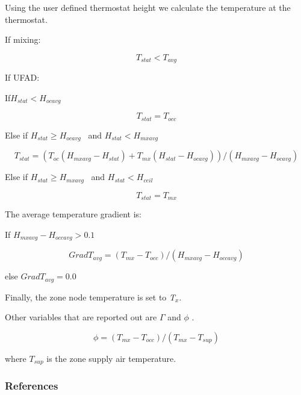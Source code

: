 Using the user defined thermostat height we calculate the temperature at the thermostat.

If mixing:

\begin{equation}
{T_{stat}} < {T_{avg}}
\end{equation}

If UFAD:

If\({H_{stat}} < {H_{ocavg}}\)

\begin{equation}
{T_{stat}} = {T_{occ}}
\end{equation}

Else if \({H_{stat}} \ge {H_{ocavg}}\) ~and \({H_{stat}} < {H_{mxavg}}\)

\begin{equation}
{T_{stat}} = \left( {{T_{oc}}\left( {{H_{mxavg}} - {H_{stat}}} \right) + {T_{mx}}\left( {{H_{stat}} - {H_{ocavg}}} \right)} \right)/\left( {{H_{mxavg}} - {H_{ocavg}}} \right)
\end{equation}

Else if \({H_{stat}} \ge {H_{mxavg}}\) ~and \({H_{stat}} < {H_{ceil}}\)

\begin{equation}
{T_{stat}} = {T_{mx}}
\end{equation}

The average temperature gradient is:

If \({H_{mxavg}} - {H_{occavg}} > 0.1\)

\begin{equation}
Grad{T_{avg}} = ({T_{mx}} - {T_{occ}})/({H_{mxavg}} - {H_{occavg}})
\end{equation}

else \(Grad{T_{avg}} = 0.0\)

Finally, the zone node temperature is set to \emph{T\(_{x}\)}.

Other variables that are reported out are \(\Gamma\) and \(\phi\) .

\begin{equation}
\phi  = ({T_{mx}} - {T_{occ}})/({T_{mx}} - {T_{sup}})
\end{equation}

where \({T_{sup}}\) is the zone supply air temperature.

\subsubsection{References}\label{references-3-000}

